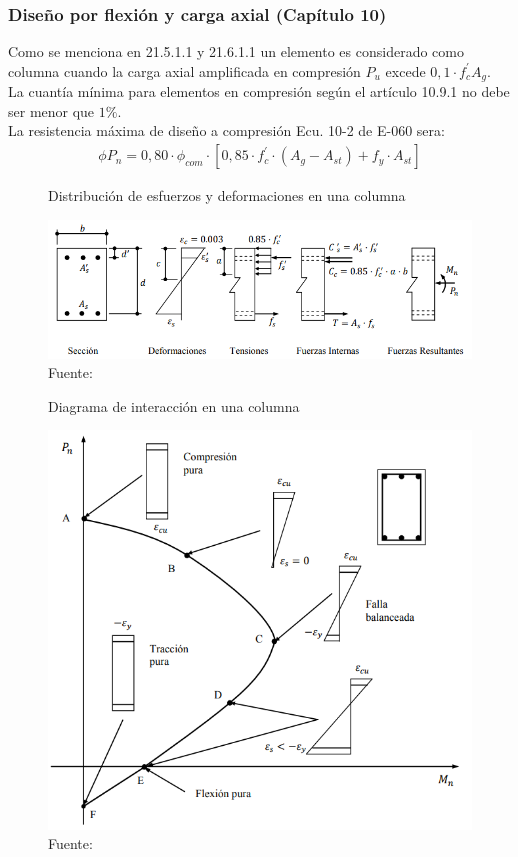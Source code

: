 \subsubsection{Diseño por flexión y carga axial (Capítulo 10)}
\noindent
Como se menciona en 21.5.1.1 y 21.6.1.1 un elemento es considerado como columna cuando la carga axial amplificada en compresión $P_{u}$ excede $0,1 \cdot f_{c}^{\prime} A_{g}$.\\
La cuantía mínima para elementos en compresión según el artículo 10.9.1 no debe ser menor que $1 \%$.\\
La resistencia máxima de diseño a compresión Ecu. 10-2 de E-060 sera:
\begin{align}
\phi P_{n}=0,80 \cdot \phi_{c o m} \cdot\left[0,85 \cdot f_{c}^{\prime} \cdot\left(A_{g}-A_{s t}\right)+f_{y} \cdot A_{s t}\right]
\end{align}
\begin{figure}[h!]
    \centering
    \caption{Distribución de esfuerzos y deformaciones en una columna}
    \includegraphics[scale=0.67]{IMAGENES/c1.PNG}
    \caption*{\small Fuente: \it \cite{cordova2015}}
    \label{vig}
\end{figure}
\newpage
\begin{figure}[ht!]
    \centering
    \caption{Diagrama de interacción en una columna}
    \includegraphics[scale=0.67]{IMAGENES/c2.PNG}
    \caption*{\small Fuente: \it \cite{cordova2015}}
    \label{vig}
\end{figure}
